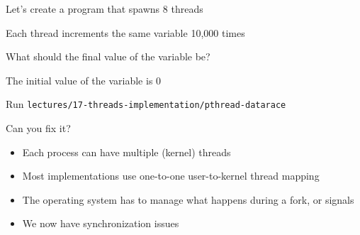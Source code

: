   \begin{slide}


    Let's create a program that spawns 8 threads

    \leftspace{}Each thread increments the same variable 10,000 times
    \medskip

    What should the final value of the variable be?

    \leftspace{}The initial value of the variable is 0
    \medskip

    Run \texttt{lectures/17-threads-implementation/pthread-datarace}

    \leftspace{}Can you fix it?

  \end{slide}

  \begin{slide}


    \begin{itemize}
      \item Each process can have multiple (kernel) threads
      \item Most implementations use one-to-one user-to-kernel thread mapping
      \item The operating system has to manage what happens during a fork, or signals
      \item We now have synchronization issues
    \end{itemize}

  \end{slide}



